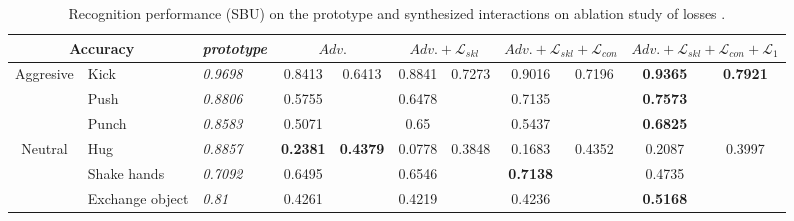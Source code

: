 \documentclass[times,twocolumn,final]{elsarticle}
\begin{document}
\begin{table*}[t]
\small
\centering
\caption{Recognition performance (SBU) on the prototype and synthesized interactions on ablation study of losses .}
\label{tab:1}
\begin{tabular}{|c|l|l|c|c|c|c|c|c|c|c|}
\hline
\multicolumn{2}{|c|}{Accuracy}               & \emph{prototype}       & \multicolumn{2}{c|}{$Adv.$}                        & \multicolumn{2}{c|}{$Adv.+\mathcal{L}_{skl}$} & \multicolumn{2}{c|}{$Adv.+\mathcal{L}_{skl}+\mathcal{L}_{con}$} & \multicolumn{2}{c|}{$Adv.+\mathcal{L}_{skl}+\mathcal{L}_{con}+\mathcal{L}_{1}$} \\ \hline
\multirow{3}{*}{Aggresive} & Kick            & \textit{0.9698} & 0.8413          & \multirow{3}{*}{0.6413}          & 0.8841        & \multirow{3}{*}{0.7273}       & 0.9016                     & \multirow{3}{*}{0.7196}            & \textbf{0.9365}                & \multirow{3}{*}{\textbf{0.7921}}               \\
                           & Push            & \textit{0.8806} & 0.5755          &                                  & 0.6478        &                               & 0.7135                     &                                    & \textbf{0.7573}                &                                                \\
                           & Punch           & \textit{0.8583} & 0.5071          &                                  & 0.65          &                               & 0.5437                     &                                    & \textbf{0.6825}                &                                                \\ \hline
\multirow{3}{*}{Neutral}   & Hug             & \textit{0.8857} & \textbf{0.2381} & \multirow{3}{*}{\textbf{0.4379}} & 0.0778        & \multirow{3}{*}{0.3848}       & 0.1683                     & \multirow{3}{*}{0.4352}            & 0.2087                         & \multirow{3}{*}{0.3997}                        \\
                           & Shake hands     & \textit{0.7092} & 0.6495          &                                  & 0.6546        &                               & \textbf{0.7138}            &                                    & 0.4735                         &                                                \\
                           & Exchange object & \textit{0.81}   & 0.4261          &                                  & 0.4219        &                               & 0.4236                     &                                    & \textbf{0.5168}                &                                                \\ \hline
\end{tabular}
\end{table*}
\end{document}
